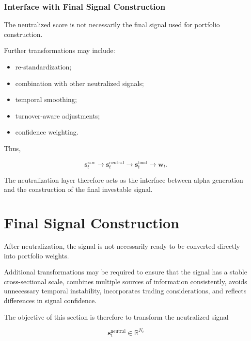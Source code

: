 \documentclass[11pt,a4paper]{article}
\begin{document}
\subsubsection{Interface with Final Signal Construction}

The neutralized score is not necessarily the final signal used for portfolio
construction.

Further transformations may include:

\begin{itemize}
    \item re-standardization;
    \item combination with other neutralized signals;
    \item temporal smoothing;
    \item turnover-aware adjustments;
    \item confidence weighting.
\end{itemize}

Thus,

\begin{equation}
\boxed{
\mathbf{s}_t^{\mathrm{raw}}
\rightarrow
\mathbf{s}_t^{\mathrm{neutral}}
\rightarrow
\mathbf{s}_t^{\mathrm{final}}
\rightarrow
\mathbf{w}_t.
}
\end{equation}

The neutralization layer therefore acts as the interface between alpha
generation and the construction of the final investable signal.


\section{Final Signal Construction}
\label{sec:final_signal_construction}

After neutralization, the signal is not necessarily ready to be converted
directly into portfolio weights.

Additional transformations may be required to ensure that the signal has a
stable cross-sectional scale, combines multiple sources of information
consistently, avoids unnecessary temporal instability, incorporates trading
considerations, and reflects differences in signal confidence.

The objective of this section is therefore to transform the neutralized signal

\begin{equation}
\mathbf{s}_t^{\mathrm{neutral}}
\in
\mathbb{R}^{N_t}
\end{equation}
\end{document}
